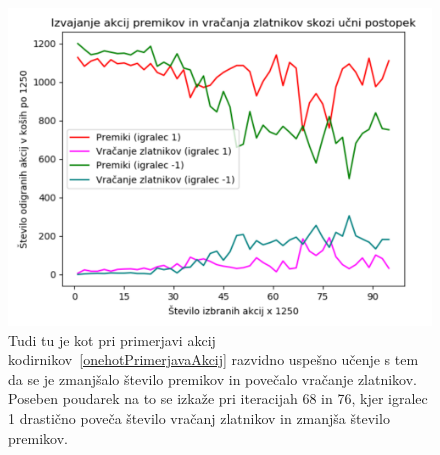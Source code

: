 \documentclass[a4paper, 12pt]{book}
\begin{document}
\begin{figure}[h]
	\begin{center}
		\includegraphics[width=1\textwidth]{photos/return_move_learn.pdf}
	\end{center}
	\caption{Tudi tu je kot pri primerjavi akcij kodirnikov~\ref{onehotPrimerjavaAkcij} razvidno uspešno učenje s tem da se je zmanjšalo število premikov in povečalo vračanje zlatnikov.
		Poseben poudarek na to se izkaže pri iteracijah 68 in 76, kjer igralec 1 drastično poveča število vračanj zlatnikov in zmanjša število premikov.}
	\label{return_move_learn}
\end{figure}
\end{document}
